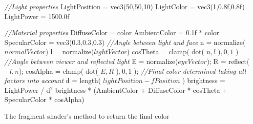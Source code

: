 \begin{algo*}
\begin{sourcecode}
\textit{//Light properties}
LightPosition = vec3(50,50,10)
LightColor = vec3(1,0.8f,0.8f)
LightPower = 1500.0f

\textit{//Material properties}
DiffuseColor = color
AmbientColor = 0.1f * color
SpecularColor = vec3(0.3,0.3,0.3)
\vspace{0.2cm}
\textit{//Angle between light and face}
n = normalize($normalVector$)
l = normalize($lightVector$)
cosTheta = clamp( dot( $n, l$ )$, 0, 1 $ )
\vspace{0.2cm}
\textit{//Angle between viewer and reflected light}
E = normalize($eyeVector$);
R = reflect($-l,n$);
cosAlpha = clamp( dot( $E,R$ )$, 0, 1$ );
\vspace{0.2cm}
\textit{//Final color determined taking all factors into account}
d = length( $lightPosition - fPosition$ )
brightness = LightPower / d$^2$
\return brightness * (AmbientColor + DiffuseColor * cosTheta + SpecularColor * cosAlpha)
\vspace{0.2cm}
\qend
\end{sourcecode}
        \caption{The fragment shader's method to return the final color}
        \label{alg:frag}
\end{algo*}
